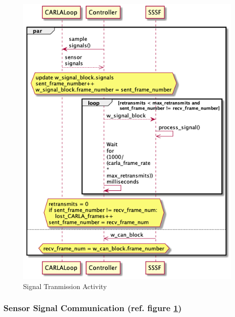 \documentclass[letterpaper,twocolumn,12pt]{article}
\begin{document}
\begin{figure}[]
    \centering
    \includegraphics[scale=0.8]{out/images/signal_control/signal_control.png}
    \caption{Signal Tranmission Activity}
    \label{fig:sig_x}
\end{figure}
\subsubsection{Sensor Signal Communication (ref. figure \ref{fig:sig_x})} \label{sec:sig_x}
\end{document}
